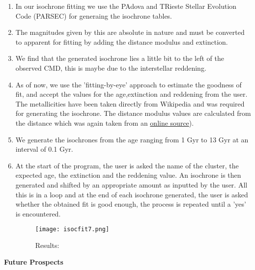 \documentclass{article}
\begin{document}
 \begin{enumerate}
     \item In our isochrone fitting we use the PAdova and TRieste Stellar Evolution Code (PARSEC) \parencite{10.1111/j.1365-2966.2012.21948.x} for generaing the isochrone tables.
     \item The magnitudes given by this are absolute in nature and must be converted to apparent for fitting by adding the distance modulus and extinction.
     \item We find that the generated isochrone lies a little bit to the left of the observed CMD, this is maybe due to the interstellar reddening. 
     \item As of now, we use the 'fitting-by-eye' approach to estimate the goodness of fit, and accept the values for the age,extinction and reddening from the user. The metallicities have been taken directly from Wikipedia and was required for generating the isochrone. The distance modulus values are calculated from the distance which was again taken from an  \href{http://gclusters.altervista.org/}{online source}). 
     \item We generate the isochrones from the age ranging from 1 Gyr to 13 Gyr at an interval of 0.1 Gyr.
     \item At the start of the program, the user is asked the name of the cluster, the expected age, the extinction and the reddening value. An isochrone is then generated and shifted by an appropriate amount as inputted by the user.\newline
     All this is in a loop and at the end of each isochrone generated, the user is asked whether the obtained fit is good enough, the process is repeated until a 'yes' is encountered.
      \begin{figure}[H]
    \caption{Results:}
    \centering
    \texttt{[image: isocfit7.png]}
    \end{figure}\newpage
\end{enumerate}
\textbf{\Large Future Prospects}\newline
\end{document}
